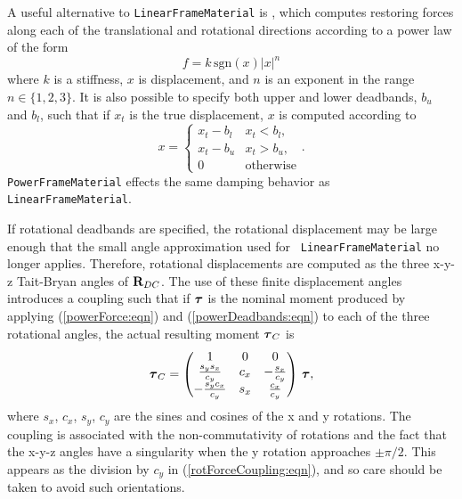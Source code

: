 A useful alternative to {\tt LinearFrameMaterial} 
is , which computes restoring forces along
each of the translational and rotational directions according to a power law of
the form
%
\begin{equation}
f = k \, \text{sgn} (x) |x|^n
\label{powerForce:eqn}
\end{equation}
%
where $k$ is a stiffness, $x$ is displacement, and $n$ is an exponent
in the range $n \in \{1,2,3\}$. It is also possible to specify both upper and
lower deadbands, $b_u$ and $b_l$, such that if $x_t$ is the true
displacement, $x$ is computed according to
%
\begin{equation}
x = \begin{cases}
x_t - b_l & x_t < b_l, \\
x_t - b_u & x_t > b_u, \\
0 & \text{otherwise} 
\end{cases}.
\label{powerDeadbands:eqn}
\end{equation}
%
{\tt PowerFrameMaterial} effects the same damping behavior as {\tt
LinearFrameMaterial}.

If rotational deadbands are specified, the rotational displacement may be large
enough that the small angle approximation used for {\tt
LinearFrameMaterial} no longer applies. Therefore, rotational displacements are
computed as the three x-y-z Tait-Bryan angles of ${\bf R}_{DC}$.  The use of
these finite displacement angles introduces a coupling such that if $\boldsymbol\tau$ is
the nominal moment produced by applying (\ref{powerForce:eqn}) and
(\ref{powerDeadbands:eqn}) to each of the
three rotational angles, the actual resulting moment $\boldsymbol\tau_C$ is
%
\begin{equation}
\boldsymbol\tau_C = \left(\begin{matrix}
1 & 0 & 0 \\
\frac{s_y s_x}{c_y} & c_x & -\frac{s_x}{c_y} \\
-\frac{s_y c_x}{c_y} & s_x & \frac{c_x}{c_y}
\end{matrix}\right)
\,
\boldsymbol\tau,
\label{rotForceCoupling:eqn}
\end{equation}
%
where $s_x$, $c_x$, $s_y$, $c_y$ are the sines and cosines of the x and y
rotations. The coupling is associated with the non-commutativity of rotations and
the fact that the x-y-z angles have a singularity when the y rotation
approaches $\pm \pi/2$. This appears as the division by $c_y$ in
(\ref{rotForceCoupling:eqn}), and so care should be taken to avoid such
orientations.

